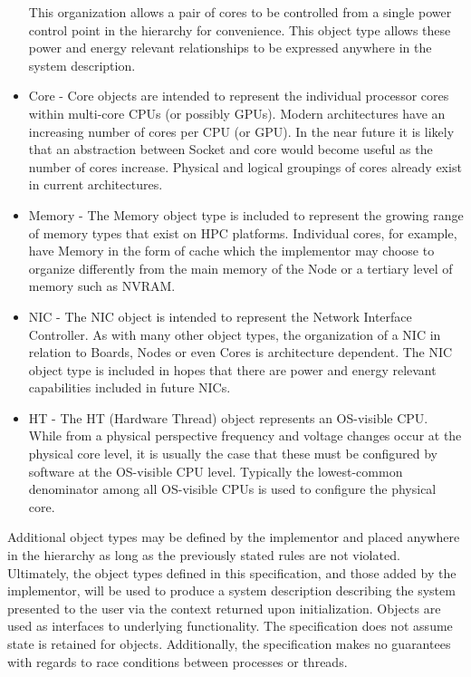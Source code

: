 \begin{itemize}[noitemsep,nolistsep]
{This organization allows a pair of cores to be controlled from a single power control point in the hierarchy for convenience. 
This object type allows these power and energy relevant relationships to be expressed anywhere in the system description.
}
	\item{
Core - Core objects are intended to represent the individual processor cores within multi-core CPUs (or possibly GPUs). 
Modern architectures have an increasing number of cores per CPU (or GPU). 
In the near future it is likely that an abstraction between Socket and core would become useful as the number of cores increase. 
Physical and logical groupings of cores already exist in current architectures.
}
	\item{Memory - The Memory object type is included to represent the growing range of memory types that exist on HPC platforms. 
Individual cores, for example, have Memory in the form of cache which the implementor may choose to organize differently from the main memory of the Node or a tertiary level of memory such as NVRAM.
}	
	\item{
NIC - The NIC object is intended to represent the Network Interface Controller.
As with many other object types, the organization of a NIC in relation to Boards, Nodes or even Cores is architecture dependent.
The NIC object type is included in hopes that there are power and energy relevant capabilities included in future NICs.
}	
        \item{
HT - The HT (Hardware Thread) object represents an OS-visible CPU.  
While from a physical perspective frequency and voltage changes occur at the physical core level, it is usually the case that these must be configured by software at the OS-visible CPU level.  
Typically the lowest-common denominator among all OS-visible CPUs is used to configure the physical core.
}

\end{itemize}

Additional object types may be defined by the implementor and placed anywhere in the hierarchy as long as the previously stated rules are not violated.
Ultimately, the  object types defined in this specification, and those added by the implementor, will be used to produce a system description describing the system presented to the user via the context returned upon initialization.
Objects are used as interfaces to underlying functionality.
The specification does not assume state is retained for objects.
Additionally, the specification makes no guarantees with regards to race conditions between processes or threads.

